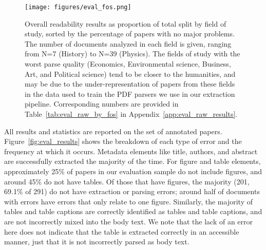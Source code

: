 \begin{figure}[th!]
    \centering
    \texttt{[image: figures/eval\_fos.png]}
    \caption{Overall readability results as proportion of total split by field of study, sorted by the percentage of papers with no major problems. The number of documents analyzed in each field is given, ranging from N=7 (History) to N=39 (Physics). The fields of study with the worst parse quality (Economics, Environmental science, Business, Art, and Political science) tend to be closer to the humanities, and may be due to the under-representation of papers from these fields in the data used to train the PDF parsers we use in our extraction pipeline. Corresponding numbers are provided in Table~\ref{tab:eval_raw_by_fos} in Appendix~\ref{app:eval_raw_results}.}
    \label{fig:eval_fos}
\end{figure}

All results and statistics are reported on the set of \numeval annotated papers. Figure~\ref{fig:eval_results} shows the breakdown of each type of error and the frequency at which it occurs. Metadata elements like title, authors, and abstract are successfully extracted the majority of the time. For figure and table elements, approximately 25\% of papers in our evaluation sample do not include figures, and around 45\% do not have tables. Of those that have figures, the majority (201, 69.1\% of 291) do not have extraction or parsing errors; around half of documents with errors have errors that only relate to one figure. Similarly, the majority of tables and table captions are correctly identified as tables and table captions, and are not incorrectly mixed into the body text. We note that the lack of an error here does not indicate that the table is extracted correctly in an accessible manner, just that it is not incorrectly parsed as body text.

